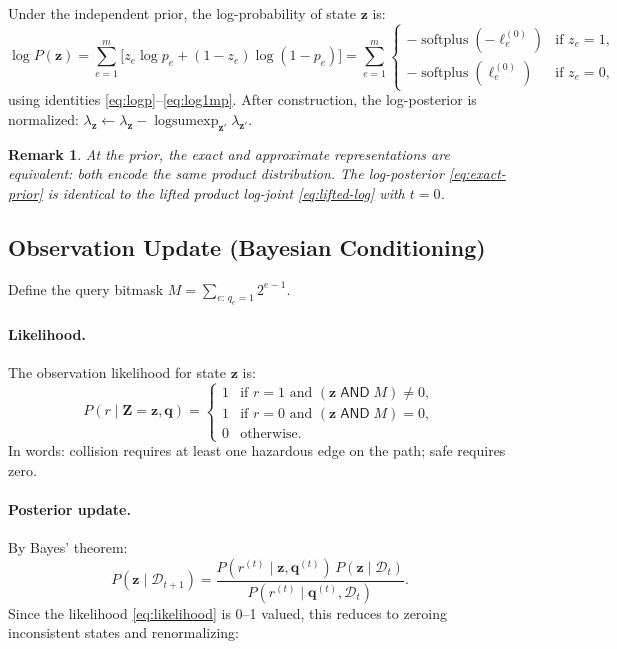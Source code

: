 \documentclass[11pt]{article}
\DeclareMathOperator{\softplus}{softplus}
\DeclareMathOperator{\logsumexp}{logsumexp}
\newtheorem{remark}{Remark}
\begin{document}
Under the independent prior, the log-probability of state $\mathbf{z}$ is:
\begin{equation}
  \log P(\mathbf{z})
  = \sum_{e=1}^{m} \bigl[z_e \log p_e + (1-z_e)\log(1-p_e)\bigr]
  = \sum_{e=1}^{m}
    \begin{cases}
      -\softplus(-\ell_e^{(0)}) & \text{if } z_e = 1, \\[2pt]
      -\softplus(\ell_e^{(0)})  & \text{if } z_e = 0,
    \end{cases}
  \label{eq:exact-prior}
\end{equation}
using identities \eqref{eq:logp}--\eqref{eq:log1mp}.
After construction, the log-posterior is normalized:
$\lambda_{\mathbf{z}} \gets \lambda_{\mathbf{z}} - \logsumexp_{\mathbf{z}'} \lambda_{\mathbf{z}'}$.

\begin{remark}
At the prior, the exact and approximate representations are equivalent:
both encode the same product distribution.  The log-posterior
\eqref{eq:exact-prior} is identical to the lifted product log-joint
\eqref{eq:lifted-log} with $t = 0$.
\end{remark}

\subsection{Observation Update (Bayesian Conditioning)}
\label{sec:exact-update}

Define the query bitmask $M = \sum_{e:\,q_e=1} 2^{e-1}$.

\paragraph{Likelihood.}
The observation likelihood for state $\mathbf{z}$ is:
\begin{equation}
  P(r \mid \mathbf{Z} = \mathbf{z}, \mathbf{q})
  = \begin{cases}
    1 & \text{if } r = 1 \text{ and } (\mathbf{z}\;\mathsf{AND}\; M) \neq 0, \\
    1 & \text{if } r = 0 \text{ and } (\mathbf{z}\;\mathsf{AND}\; M) = 0, \\
    0 & \text{otherwise}.
  \end{cases}
  \label{eq:likelihood}
\end{equation}
In words: collision requires at least one hazardous edge on the path;
safe requires zero.

\paragraph{Posterior update.}
By Bayes' theorem:
\begin{equation}
  P(\mathbf{z} \mid \mathcal{D}_{t+1})
  = \frac{P(r^{(t)} \mid \mathbf{z}, \mathbf{q}^{(t)})\, P(\mathbf{z} \mid \mathcal{D}_t)}
         {P(r^{(t)} \mid \mathbf{q}^{(t)}, \mathcal{D}_t)}.
  \label{eq:bayes-exact}
\end{equation}
Since the likelihood \eqref{eq:likelihood} is 0--1 valued, this reduces
to zeroing inconsistent states and renormalizing:
\end{document}
